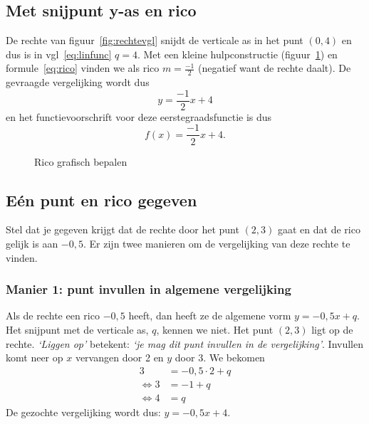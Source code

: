 \subsection{Met snijpunt y-as en rico}
De rechte van figuur~\ref{fig:rechtevgl} snijdt de verticale as in het punt $(0,4)$ en dus is in vgl~\eqref{eq:linfunc} $q=4$. Met een kleine hulpconstructie (figuur~\ref{fig:rechtevgl2}) en formule~\eqref{eq:rico} vinden we als rico $m=\frac{-1}{2}$ (negatief want de rechte daalt). De gevraagde vergelijking wordt dus
\[
y=\frac{-1}{2}x+4
\]
en het functievoorschrift voor deze eerstegraadsfunctie is dus
\[
f(x)=\frac{-1}{2}x+4.
\]
\begin{figure}[htbp]
    \centering
{}
\caption{Rico grafisch bepalen}
    \label{fig:rechtevgl2}
\end{figure}

\subsection{Eén punt en rico gegeven}
Stel dat je gegeven krijgt dat de rechte door het punt $(2,3)$ gaat en dat de rico gelijk is aan $-0,5$. Er zijn twee manieren om de vergelijking van deze rechte te vinden.

\subsubsection{Manier 1: punt invullen in algemene vergelijking}
Als de rechte een rico $-0,5$ heeft, dan heeft ze de algemene vorm $y=-0,5x+q$. Het snijpunt met de verticale as, $q$, kennen we niet. Het punt $(2,3)$ ligt op de rechte. \emph{`Liggen op'} betekent: \emph{`je mag dit punt invullen in de vergelijking'}. Invullen komt neer op $x$ vervangen door 2 en $y$ door 3. We bekomen 
\begin{align*}
3&=-0,5\cdot 2 + q\\
\Leftrightarrow 3&=-1+q\\
\Leftrightarrow 4&=q
\end{align*}
De gezochte vergelijking wordt dus: $y=-0,5x+4$.

